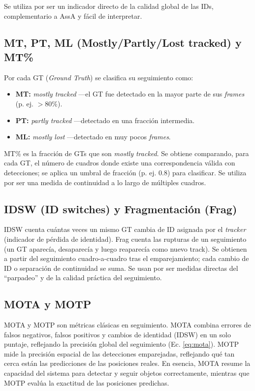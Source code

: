 Se utiliza por ser un indicador directo de la calidad global de las IDs, complementario a AssA y fácil de interpretar.

\subsection{MT, PT, ML (Mostly/Partly/Lost tracked) y MT\%}
Por cada GT (\textit{Ground Truth}) se clasifica su seguimiento como:
\begin{itemize}
  \setlength{\itemsep}{0pt}%
  \setlength{\parskip}{0pt}%
  \setlength{\parsep}{0pt}%
  \item \textbf{MT:} \textit{mostly tracked} ---el GT fue detectado en la mayor parte de sus \textit{frames} (p. ej. $>80\%$).
  \item \textbf{PT:} \textit{partly tracked} ---detectado en una fracción intermedia.
  \item \textbf{ML:} \textit{mostly lost} ---detectado en muy pocos \textit{frames}.
\end{itemize}

MT\% es la fracción de GTs que son \textit{mostly tracked}. Se obtiene comparando, para cada GT, el número de cuadros donde existe una correspondencia válida con detecciones; se aplica un umbral de fracción (p. ej. 0.8) para clasificar. Se utiliza por ser una medida de continuidad a lo largo de múltiples cuadros.

\subsection{IDSW (ID switches) y Fragmentación (Frag)}
IDSW \cite{IDSW} cuenta cuántas veces un mismo GT cambia de ID asignada por el \textit{tracker} (indicador de pérdida de identidad). Frag cuenta las rupturas de un seguimiento (un GT aparecía, desaparecía y luego reaparecía como nuevo track). Se obtienen a partir del seguimiento cuadro-a-cuadro tras el emparejamiento; cada cambio de ID o separación de continuidad se suma. Se usan por ser medidas directas del ``parpadeo'' y de la calidad práctica del seguimiento.

\subsection{MOTA y MOTP}
MOTA \cite{MOTA} y MOTP son métricas clásicas en seguimiento. MOTA combina errores de falsos negativos, falsos positivos y cambios de identidad (IDSW) en un solo puntaje, reflejando la precisión global del seguimiento (Ec. \ref{eq:mota}). MOTP mide la precisión espacial de las detecciones emparejadas, reflejando qué tan cerca están las predicciones de las posiciones reales. En esencia, MOTA resume la capacidad del sistema para detectar y seguir objetos correctamente, mientras que MOTP evalúa la exactitud de las posiciones predichas.

